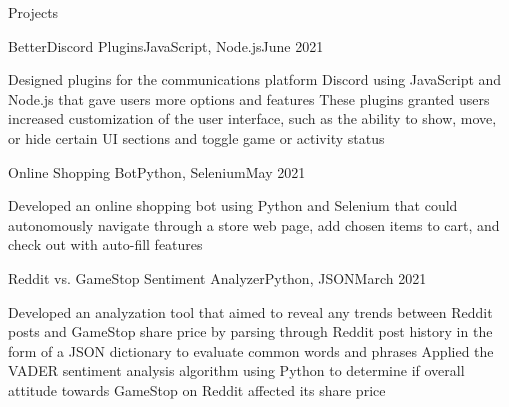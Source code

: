 \documentclass[fit]{cvtemplate}
\begin{document}
\begin{cvtext}
\begin{cvsection}{Projects}






  \begin{cvsubsection}
    {BetterDiscord Plugins}{JavaScript, Node.js}{June 2021}{}

    \listitem Designed plugins for the communications platform Discord using JavaScript and Node.js that gave users more options and features
    \listitem These plugins granted users increased customization of the user interface, such as the ability to show, move, or hide certain UI sections and toggle game or activity status

  \end{cvsubsection}


  \begin{cvsubsection}
    {Online Shopping Bot}{Python, Selenium}{May 2021}{}

    \listitem Developed an online shopping bot using Python and Selenium that could autonomously navigate through a store web page, add chosen items to cart, and check out with auto-fill features

  \end{cvsubsection}


  \begin{cvsubsection}
    {Reddit vs. GameStop Sentiment Analyzer}{Python, JSON}{March 2021}{}

    \listitem  Developed an analyzation tool that aimed to reveal any trends between Reddit posts and GameStop share price by parsing through Reddit post history in the form of a JSON dictionary to evaluate common words and phrases
    \listitem  Applied the VADER sentiment analysis algorithm using Python to determine if overall attitude towards GameStop on Reddit affected its share price


\end{cvsubsection}
\end{cvsection}
\end{cvtext}
\end{document}
